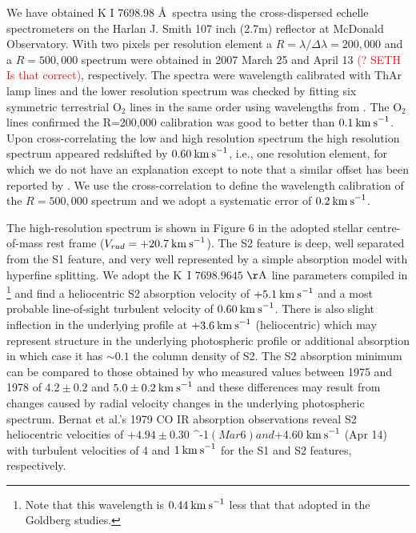 \documentclass[preprint2]{aastex}
\begin{document}
We have obtained K I 7698.98 \AA \ spectra using the cross-dispersed echelle spectrometers on the Harlan J. Smith 107 inch (2.7m) reflector at McDonald Observatory. With two pixels per resolution element a $R=\lambda/\Delta\lambda=200,000$ and a $R=500,000$ spectrum were obtained in 2007 March 25 and April 13 \textcolor{red}{(? SETH Is that correct)}, respectively. The spectra were wavelength calibrated with ThAr lamp lines and the lower resolution spectrum was checked by fitting six symmetric terrestrial O${}_2$ lines in the same order using wavelengths from \cite{1948ApJ...108..167B}. The O${}_2$ lines confirmed the R=200,000 calibration was good to better than $0.1\>{\rm km\>s}^{-1}$. Upon cross-correlating the low and high resolution spectrum the high resolution spectrum appeared redshifted by $0.60\>{\rm km\>s}^{-1}$, i.e., one resolution element, for which we do not have an explanation except to note that a similar offset has been reported by \cite{1994ApJ...436..152W}. We use the cross-correlation to define the wavelength calibration of the $R=500,000$ spectrum and we adopt a systematic error of $0.2\>{\rm km\>s}^{-1}$.

The high-resolution spectrum is shown in Figure 6 in the adopted stellar centre-of-mass rest frame 
($V_{rad}=+20.7\>{\rm km\>s}^{-1}$). The S2 feature is deep, well separated from the S1 feature, and very well represented by a simple absorption model with hyperfine splitting. We adopt the K~I $7698.9645$ $\rm{\AA}$ line parameters compiled in \cite{2003ApJS..149..205M}\footnote{Note that this wavelength is $0.44\>{\rm km\>s}^{-1}$ less that that adopted in the Goldberg studies.} and find a heliocentric S2 absorption velocity of $+5.1\>{\rm km\>s}^{-1}$ and a most probable line-of-sight turbulent velocity of $0.60\>{\rm km\>s}^{-1}$. There is also slight inflection in the underlying profile at $+3.6\>{\rm km\>s}^{-1}$ (heliocentric) which may represent structure in the underlying photospheric profile or additional absorption in which case it has $\sim 0.1$ the column density of S2.  The S2 absorption minimum can be compared to those obtained by \citet[Fig 7]{1979QJRAS..20..361G} who measured values between 1975 and 1978 of $4.2\pm 0.2$ and $5.0\pm 0.2 \>{\rm km\>s}^{-1}$ and these differences may result from changes caused by radial velocity changes in the underlying photospheric spectrum. Bernat et al.'s 1979 CO IR absorption observations reveal S2 heliocentric velocities of $+4.94\pm 0.30$ ^{-1}$ (Mar 6) and $+4.60$ \>{\rm km\>s}^{-1}$ (Apr 14) with turbulent velocities of 4 and $1\>{\rm km\>s}^{-1}$ for the S1 and S2 features, respectively.
\end{document}
